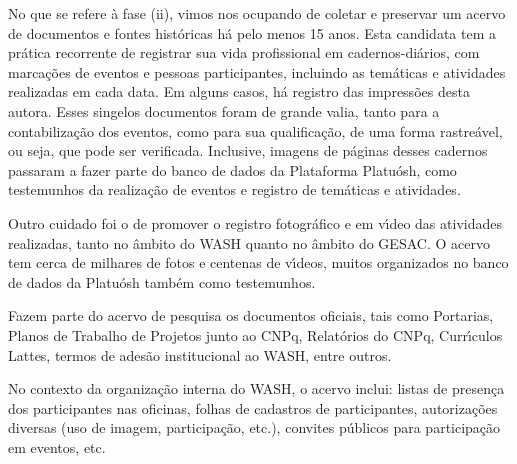 \documentclass[
12pt,		%
openright,	%
twoside,  %
a4paper,			%
chapter=TITLE,		%
english,			%
french,				%
spanish,			%
brazil				%
]{USPSC-classe/USPSC}
\begin{document}
No que se refere \`a fase (ii), vimos nos ocupando de coletar e preservar um acervo de documentos e fontes hist\'oricas h\'a pelo menos 15 anos. Esta candidata tem a pr\'atica recorrente de registrar sua vida profissional em cadernos-di\'arios, com marca\c{c}\~oes de eventos e pessoas participantes, incluindo as tem\'aticas e atividades realizadas em cada data. Em alguns casos, h\'a registro das impress\~oes desta autora. Esses singelos documentos foram de grande valia, tanto para a contabiliza\c{c}\~ao dos eventos, como para sua qualifica\c{c}\~ao, de uma forma rastre\'avel, ou seja, que pode ser verificada. Inclusive, imagens de p\'aginas desses cadernos passaram a fazer parte do banco de dados da Plataforma Platu\'osh, como testemunhos da realiza\c{c}\~ao de eventos e registro de tem\'aticas e atividades.

















Outro cuidado foi o de promover o registro fotogr\'afico e em v\'{\i}deo das atividades realizadas, tanto no \^ambito do WASH quanto no \^ambito do GESAC. O acervo tem cerca de milhares de fotos e centenas de v\'{\i}deos, muitos organizados no banco de dados da Platu\'osh tamb\'em como testemunhos.

















Fazem parte do acervo de pesquisa os documentos oficiais, tais como Portarias, Planos de Trabalho de Projetos junto ao CNPq, Relat\'orios do CNPq, Curr\'{\i}culos Lattes, termos de ades\~ao institucional ao WASH, entre outros.

















No contexto da organiza\c{c}\~ao interna do WASH, o acervo inclui: listas de presen\c{c}a dos participantes nas oficinas, folhas de cadastros de participantes, autoriza\c{c}\~oes diversas (uso de imagem, participa\c{c}\~ao, etc.), convites p\'ublicos  para participa\c{c}\~ao em eventos, etc.
\end{document}
